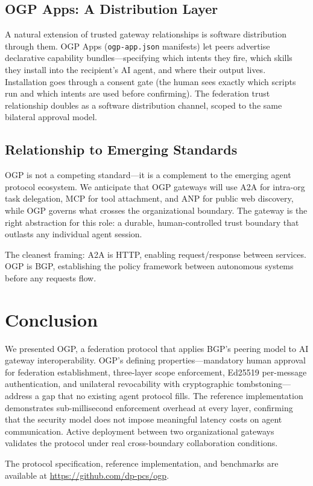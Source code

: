 \documentclass[sigconf,nonacm]{acmart}
\begin{document}
\subsection{OGP Apps: A Distribution Layer}

A natural extension of trusted gateway relationships is software
distribution through them. OGP Apps (\texttt{ogp-app.json} manifests)
let peers advertise declarative capability bundles---specifying which
intents they fire, which skills they install into the recipient's AI
agent, and where their output lives. Installation goes through a
consent gate (the human sees exactly which scripts run and which
intents are used before confirming). The federation trust relationship
doubles as a software distribution channel, scoped to the same
bilateral approval model.

\subsection{Relationship to Emerging Standards}

OGP is not a competing standard---it is a complement to the emerging
agent protocol ecosystem. We anticipate that OGP gateways will use
A2A for intra-org task delegation, MCP for tool attachment, and ANP
for public web discovery, while OGP governs what crosses the
organizational boundary. The gateway is the right abstraction for this
role: a durable, human-controlled trust boundary that outlasts any
individual agent session.

The cleanest framing: A2A is HTTP, enabling request/response between
services. OGP is BGP, establishing the policy framework between autonomous
systems before any requests flow.

\section{Conclusion}

We presented OGP, a federation protocol that applies BGP's peering
model to AI gateway interoperability. OGP's defining properties---mandatory
human approval for federation establishment, three-layer scope enforcement,
Ed25519 per-message authentication, and unilateral revocability with
cryptographic tombstoning---address a gap that no existing agent protocol
fills. The reference implementation demonstrates sub-millisecond enforcement
overhead at every layer, confirming that the security model does not impose
meaningful latency costs on agent communication. Active deployment between
two organizational gateways validates the protocol under real cross-boundary
collaboration conditions.

The protocol specification, reference implementation, and benchmarks are
available at \url{https://github.com/dp-pcs/ogp}.



\end{document}
